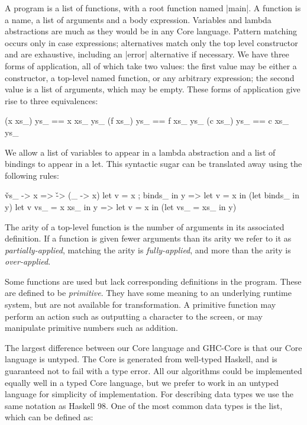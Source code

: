 A program is a list of functions, with a root function named |main|. A function is a name, a list of arguments and a body expression. Variables and lambda abstractions are much as they would be in any Core language.  Pattern matching occurs only in case expressions; alternatives match only the top level constructor and are exhaustive, including an |error| alternative if necessary. We have three forms of application, all of which take two values: the first value may be either a constructor, a top-level named function, or any arbitrary expression; the second value is a list of arguments, which may be empty. These forms of application give rise to three equivalences:

\begin{code}
(x xs_) ys_ == x xs_ ys_
(f xs_) ys_ == f xs_ ys_
(c xs_) ys_ == c xs_ ys_
\end{code}

We allow a list of variables to appear in a lambda abstraction and a list of bindings to appear in a let. This syntactic sugar can be translated away using the following rules:

\begin{code}
\v vs_ -> x              => \v -> (\vs_ -> x)
let v = x ; binds_ in y  => let v = x in (let binds_ in y)
let v vs_ = x xs_ in y   => let v = x in (let vs_ = xs_ in y)
\end{code}

The arity of a top-level function is the number of arguments in its associated definition. If a function is given fewer arguments than its arity we refer to it as \textit{partially-applied}, matching the arity is \textit{fully-applied}, and more than the arity is \textit{over-applied}.

Some functions are used but lack corresponding definitions in the program. These are defined to be \textit{primitive}. They have some meaning to an underlying runtime system, but are not available for transformation. A primitive function may perform an action such as outputting a character to the screen, or may manipulate primitive numbers such as addition.

The largest difference between our Core language and GHC-Core \cite{ghc_core} is that our Core language is untyped. The Core is generated from well-typed Haskell, and is guaranteed not to fail with a type error. All our algorithms could be implemented equally well in a typed Core language, but we prefer to work in an untyped language for simplicity of implementation. For describing data types we use the same notation as Haskell 98. One of the most common data types is the list, which can be defined as:

